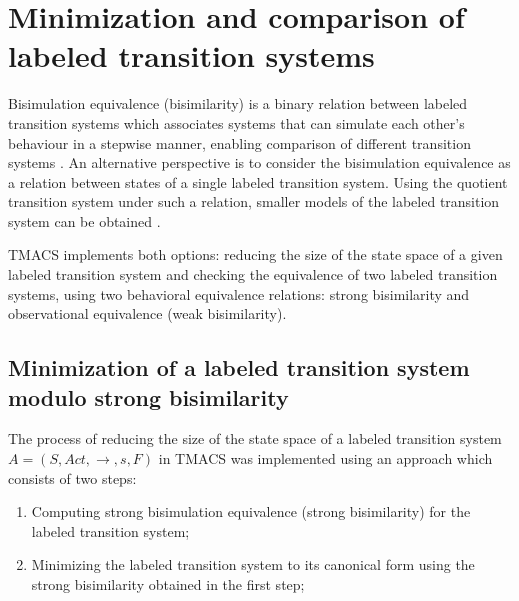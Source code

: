 \section{Minimization and comparison of labeled transition systems}
\label{sec:bisimulation}

Bisimulation equivalence (bisimilarity) \cite{Park} is a binary relation between labeled transition systems which associates systems that can simulate each other's behaviour in a stepwise manner, enabling comparison of different transition systems \cite{ModelChecking}. An alternative perspective is to consider the bisimulation equivalence as a relation between states of a single labeled transition system. Using the quotient transition system under such a relation, smaller models of the labeled transition system can be obtained \cite{ModelChecking}.


TMACS implements both options: reducing the size of the state space of a given labeled transition system and checking the equivalence of two labeled transition systems, using two behavioral equivalence relations: strong bisimilarity and observational equivalence (weak bisimilarity).

\subsection{Minimization of a labeled transition system modulo strong bisimilarity}
The process of reducing the size of the state space of a labeled transition system $A=\left(S, Act, \rightarrow, s, F \right)$ in TMACS was implemented using an approach which consists of two steps:
\begin{enumerate}
\item Computing strong bisimulation equivalence (strong bisimilarity) for the labeled transition system;
\item Minimizing the labeled transition system to its canonical form using the strong bisimilarity obtained in the first step;
\end{enumerate}

